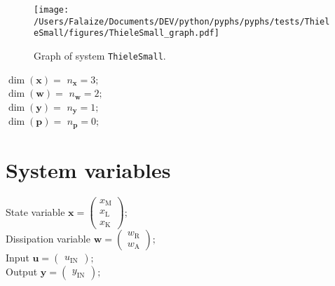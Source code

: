 \documentclass[11pt, oneside]{article}      %
\begin{document}
%
    \begin{figure}[!h]
    \begin{center}
    \texttt{[image: /Users/Falaize/Documents/DEV/python/pyphs/pyphs/tests/ThieleSmall/figures/ThieleSmall\_graph.pdf]}
    \caption{\label{fig:graph_ThieleSmall} Graph of system \texttt{ThieleSmall}. }
    \end{center}
    \end{figure}
%
$\dim(\mathbf{x})=$ $ n_\mathbf{x} = 3 ; $ 
%
\\
%
$\dim(\mathbf{w})=$ $ n_\mathbf{w} = 2 ; $ 
%
\\
%
$\dim(\mathbf{y})=$ $ n_\mathbf{y} = 1 ; $ 
%
\\
%
$\dim(\mathbf{p})=$ $ n_\mathbf{p} = 0 ; $ 
%
\\
%
%
\section{System variables}
%
State variable $ \mathbf{x} = \left(\begin{array}{c}x_{\mathrm{M}}\\x_{\mathrm{L}}\\x_{\mathrm{K}}\end{array}\right) ; $ 
%
\\
%
Dissipation variable $ \mathbf{w} = \left(\begin{array}{c}w_{\mathrm{R}}\\w_{\mathrm{A}}\end{array}\right) ; $ 
%
\\
%
Input $ \mathbf{u} = \left(\begin{array}{c}u_{\mathrm{IN}}\end{array}\right) ; $ 
%
\\
%
Output $ \mathbf{y} = \left(\begin{array}{c}y_{\mathrm{IN}}\end{array}\right) ; $ 
%
\\
%
%
\end{document}
